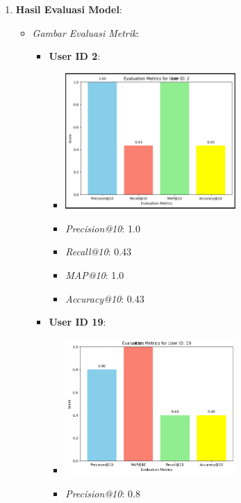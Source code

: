 \documentclass[journal,article,submit,pdftex,moreauthors]{Definitions/mdpi}
\begin{document}
\begin{enumerate}
    \item \textbf{Hasil Evaluasi Model}:
    \begin{itemize}
        \item \textit{Gambar Evaluasi Metrik}:
        \begin{itemize}
            \item \textbf{User ID 2}:
            \begin{itemize}
                \item \includegraphics[width=0.6\textwidth]{images/metric1.jpeg}
                \item \textit{Precision@10}: 1.0
                \item \textit{Recall@10}: 0.43
                \item \textit{MAP@10}: 1.0
                \item \textit{Accuracy@10}: 0.43
            \end{itemize}
            \item \textbf{User ID 19}:
            \begin{itemize}
                \item \includegraphics[width=0.6\textwidth]{images/metric2.jpeg}
                \item \textit{Precision@10}: 0.8

\end{itemize}
\end{itemize}
\end{itemize}
\end{enumerate}
\end{document}
